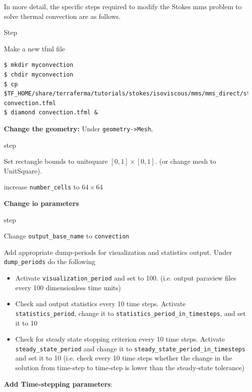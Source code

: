 In more detail, the specific steps required to modify the Stokes mms
problem to solve thermal convection are as follows.
\begin{steps}{Step}
\item Make a new tfml file
  \begin{lstlisting}[style=Bash]
$ mkdir myconvection
$ chdir myconvection
$ cp $TF_HOME/share/terraferma/tutorials/stokes/isoviscous/mms/mms_direct/stokes.tfml convection.tfml
$ diamond convection.tfml &
  \end{lstlisting}%
\item \textbf{Change the geometry:} Under \texttt{geometry->Mesh},
  \begin{steps}{step}

  \item Set rectangle bounds to unitsquare $[0,1]\times[0,1]$. (or
    change mesh to UnitSquare).
  \item increase \texttt{number\_cells} to $64\times64$
  \end{steps}
\item \textbf{Change io parameters}
  \begin{steps}{step}
  \item Change \texttt{output\_base\_name} to \texttt{convection}
  \item Add appropriate dump-periods for visualization and statistics
    output.  Under \texttt{dump\_periods} do the following
    \begin{itemize}
    \item Activate \texttt{visualization\_period} and set to
      100. (i.e. output paraview files every 100 dimensionless time units)
    \item Check and output statistics every 10 time steps. Activate
      \texttt{statistics\_period}, change it to
      \texttt{statistics\_period\_in\_timesteps}, and set it to 10
    \item Check for steady state stopping criterion every 10 time
      steps. Activate \texttt{steady\_state\_period} and change it to
      \texttt{steady\_state\_period\_in\_timesteps} and set it to 10
      (i.e. check every 10 time steps  whether the change in the solution from
      time-step to time-step is lower than the steady-state tolerance)
    \end{itemize}
  \end{steps}
\item \textbf{Add Time-stepping parameters}:

\end{steps}
